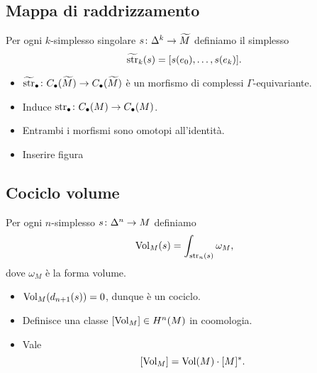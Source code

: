 \documentclass{beamer}
\begin{document}
\subsection{Mappa di raddrizzamento}
\begin{frame}{\secname}{\subsecname}
Per ogni $k$-simplesso singolare $\map{s}{\Delta^k}{\widetilde M}$ definiamo il simplesso
\[
\widetilde{\operatorname{str}}_k(s)=[s(e_0),\ldots,s(e_k)].
\]

\begin{minipage}[t]{.6\textwidth}
\begin{itemize}
\item $\map{\tstr_\bul}{C_\bul(\widetilde M)}{C_\bul(\widetilde M)}$ è un morfismo di complessi $\Gamma$-equivariante.
\item Induce $\map{\str_\bul}{C_\bul(M)}{C_\bul(M)}$.
\item Entrambi i morfismi sono omotopi all'identità.
\end{itemize}
\end{minipage}
\begin{minipage}[t]{.35\textwidth}
\begin{itemize}
\item\huge Inserire figura
\end{itemize}
\end{minipage}
\end{frame}
\subsection*{Cociclo volume}
\begin{frame}{\secname}{\subsecname}
Per ogni $n$-simplesso $\map{s}{\Delta^n}{M}$ definiamo
\[
\operatorname{Vol}_M(s)=\int_{\operatorname{str}_n(s)}\omega_M,
\]
dove $\omega_M$ è la forma volume.
\begin{itemize}
\item $\operatorname{Vol}_M(d_{n+1}(s))=0$, dunque è un cociclo.
\item Definisce una classe $[\operatorname{Vol}_M]\in H^n(M)$ in coomologia.
\item Vale 
\[
[\operatorname{Vol}_M]=\operatorname{Vol}(M)\cdot[M]^*.
\]
\end{itemize}
\end{frame}
\end{document}
